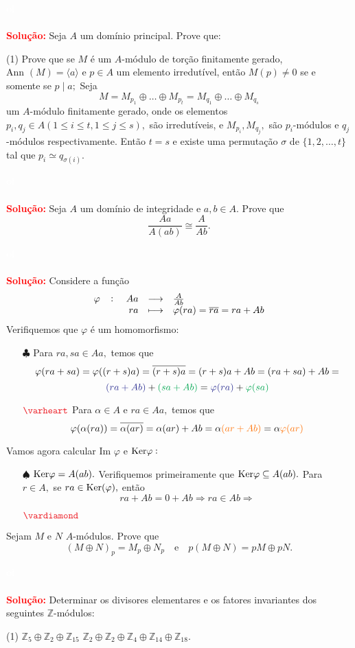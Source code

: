 \documentclass[11pt,a4paper]{article}
\newcounter{exercicio}[section]
\newcommand{\dividiritens}[1]{\begin{tasks}[counter-format={(tsk[a])},label-width=3.6ex, label-format = {\bfseries}, column-sep = {0pt}](1) #1 \end{tasks}}
\newcommand{\pers}[1]{\textcolor{Floresta}{$\negrito{(#1)} $}}
\newcommand{\solucao}[1]{
\textbf{\textcolor{white}{oi}\\ \\ \textcolor{red}{Solução:}} #1}
\begin{document}
\solucao{}
 Seja $A$ um domínio principal. Prove que:
\dividiritens{
\task[\pers{a}]  Prove que se $M$ é um $A$-módulo de torção finitamente gerado, $\mbox{Ann } (M) = \langle a \rangle$ e $p \in A$ um elemento irredutível, então $M(p) \neq 0$ se e somente se $p \mid a;$
\task[\pers{b}] Seja
\[
M = M_{p_1} \oplus \ldots \oplus M_{p_t} = M_{q_1} \oplus \ldots \oplus M_{q_s} 
\]
um $A$-módulo finitamente gerado, onde os elementos $p_i, q_j \in A (1 \le i \le t, 1 \le j \le s),$ são irredutíveis, e $M_{p_i}, M_{q_j},$ são $p_i$-módulos e $q_j$-módulos respectivamente. Então $t = s$ e existe uma permutação $\sigma$ de $\{ 1, 2, \ldots, t \}$ tal que $p_i \simeq q_{\sigma(i)}.$
}
\solucao{}
 Seja $A$ um domínio de integridade e $a, b \in A.$ Prove que 
\[\frac{Aa}{A(ab)} \cong \frac{A}{Ab}.\]
\solucao{
Considere a função
\[
\fullfunction{\varphi}{Aa}{\frac{A}{Ab}}{ra}{\varphi(ra) = \overline{ra} = ra + Ab}
\]
Verifiquemos que $\varphi$ é um homomorfismo:
\begin{itemize}
    \item[$\clubsuit$] Para $ra, sa \in Aa,$ temos que
    \[
    \varphi(ra + sa) = \varphi((r+s)a) = \overline{(r+s)a} = (r+s)a + Ab = (ra + sa) + Ab = \]\[\textcolor{Blue}{(ra + Ab)} + \textcolor{Green}{(sa + Ab)} = \textcolor{Blue}{\varphi(ra)} + \textcolor{Green}{\varphi(sa)}
    \]
    \item[$\textcolor{Red}{\varheart}$] Para $\alpha \in A$ e $ra \in Aa,$ temos que
    \[
    \varphi(\alpha(ra)) = \overline{\alpha (ar)} = \alpha (ar) + Ab = \alpha \textcolor{Laranja}{(ar + Ab)} = \alpha  \textcolor{Laranja}{\varphi(ar)}
    \]
\end{itemize}
Vamos agora calcular $\mbox{Im } \varphi$ e ${\rm Ker} \varphi :$
\begin{itemize}
    \item[$\spadesuit$] ${\rm Ker} \varphi = A(ab).$ Verifiquemos primeiramente que ${\rm Ker} \varphi \subseteq A(ab).$ Para $r \in A,$ se $ra \in {\rm Ker}(\varphi),$ então 
    \[
    ra + Ab = 0 + Ab \Rightarrow ra \in Ab \Rightarrow
    \]
    
    \item[$\textcolor{Red}{\vardiamond}$]
\end{itemize}
}
 Sejam $M$ e $N$ $A$-módulos. Prove que
\[
(M \oplus N)_p = M_p \oplus N_p \quad \mbox{e} \quad p(M \oplus N) = pM \oplus pN.
\]
\solucao{}
  Determinar os divisores elementares e os fatores invariantes dos seguintes $\mathbb{Z}$-módulos:
\dividiritens{
\task[\pers{a}] $\mathbb{Z}_5 \oplus \mathbb{Z}_2 \oplus \mathbb{Z}_{15}$
\task[\pers{b}] $\mathbb{Z}_2 \oplus \mathbb{Z}_2 \oplus \mathbb{Z}_{4} \oplus \mathbb{Z}_{14} \oplus \mathbb{Z}_{18}.$
}
\end{document}
